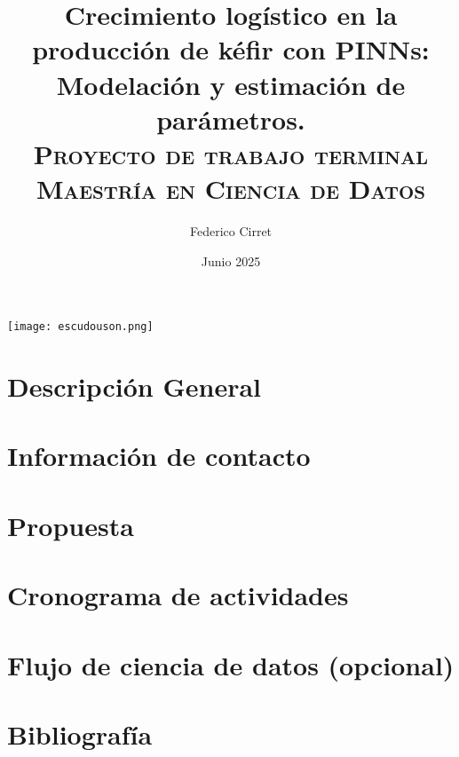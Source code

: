 \documentclass{amsart}
\title[%
    Crecimiento logístico en la producción de kéfir con
    PINNs: Modelación y estimación de parámetros.
]{%
    \sffamily
    Crecimiento logístico en la producción de kéfir con
    PINNs: Modelación y estimación de parámetros.
    \\
    \tiny\textsc{Proyecto de trabajo terminal
    Maestría en Ciencia de Datos}
}
\begin{document}
    \begin{center}
        \texttt{[image: escudouson.png]}
    \end{center}
    \author{Federico Cirret}
    \date{Junio 2025}
    \maketitle
    \thispagestyle{empty}
    \section{Descripción General}
        
    \section{Información de contacto}
        
    \section{Propuesta}
        
    \section{Cronograma de actividades}
        
    \section{Flujo de ciencia de datos (opcional)}
    \section{Bibliografía}
    
    
\end{document}

